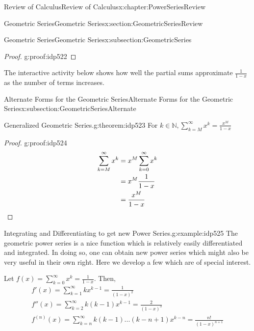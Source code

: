 \documentclass[oneside,10pt,]{book}
\newcommand{\qedhere}{\relax}
\numberwithin{equation}{section}
\begin{document}
\begin{chapterptx}{Review of Calculus}{}{Review of Calculus}{}{}{x:chapter:PowerSeriesReview}
\begin{sectionptx}{Geometric Series}{}{Geometric Series}{}{}{x:section:GeometricSeriesReview}
\begin{subsectionptx}{Geometric Series}{}{Geometric Series}{}{}{x:subsection:GeometricSeries}
\begin{proof}{}{g:proof:idp522}
\end{proof}
The interactive activity below shows how well the partial sums approximate \(\frac{1}{1-x}\) as the number of terms increases.%
\end{subsectionptx}
%
%
\typeout{************************************************}
\typeout{************************************************}
%
\begin{subsectionptx}{Alternate Forms for the Geometric Series}{}{Alternate Forms for the Geometric Series}{}{}{x:subsection:GeometricSeriesAlternate}
\begin{theorem}{Generalized Geometric Series.}{}{g:theorem:idp523}%
For \(k \in \mathbb{N}, \sum_{k=M}^{\infty} {x^k} = \frac{x^M}{1-x}\)\end{theorem}
\begin{proof}{}{g:proof:idp524}
%
\begin{align*}
\sum_{k=M}^{\infty} {x^k} & = x^M \sum_{k=0}^{\infty} {x^k}\\
& = x^M \frac{1}{1-x}\\
& = \frac{x^M}{1-x}\qedhere
\end{align*}
\end{proof}
\begin{example}{Integrating and Differentiating to get new Power Series.}{g:example:idp525}%
The geometric power series is a nice function which is relatively easily differentiated and integrated. In doing so, one can obtain new power series which might also be very useful in their own right.  Here we develop a few which are of special interest.%
\par
Let \(f(x) = \sum_{k=0}^\infty x^k = \frac{1}{1-x}\).  Then,%
%
\begin{gather*}
f'(x) = \sum_{k=1}^{\infty} {kx^{k-1}} = \frac{1}{(1-x)^2}\\
f''(x) = \sum_{k=2}^{\infty} {k(k-1)x^{k-1}} = \frac{2}{(1-x)^3}\\
f^{(n)}(x) = \sum_{k=n}^{\infty} {k(k-1)...(k-n+1)x^{k-n}} = \frac{n!}{(1-x)^{n+1}}\\

\end{gather*}
\end{example}
\end{subsectionptx}
\end{sectionptx}
\end{chapterptx}
\end{document}

